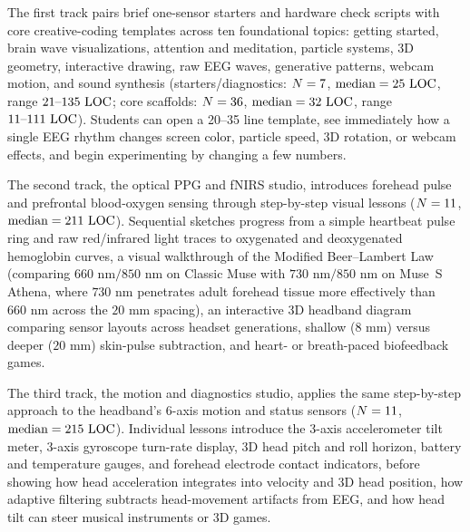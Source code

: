 \documentclass[11pt]{article}
\begin{document}
The first track pairs brief one-sensor starters and hardware check scripts with core creative-coding templates across ten foundational topics: getting started, brain wave visualizations, attention and meditation, particle systems, 3D geometry, interactive drawing, raw EEG waves, generative patterns, webcam motion, and sound synthesis (starters/diagnostics: $N = 7$, $\text{median} = 25\text{ LOC}$, range $21\text{--}135\text{ LOC}$; core scaffolds: $N = 36$, $\text{median} = 32\text{ LOC}$, range $11\text{--}111\text{ LOC}$). Students can open a 20--35 line template, see immediately how a single EEG rhythm changes screen color, particle speed, 3D rotation, or webcam effects, and begin experimenting by changing a few numbers.

The second track, the optical PPG and fNIRS studio, introduces forehead pulse and prefrontal blood-oxygen sensing through step-by-step visual lessons \citep{wyser2020short,russo2025fnirs} ($N = 11$, $\text{median} = 211\text{ LOC}$). Sequential sketches progress from a simple heartbeat pulse ring and raw red/infrared light traces to oxygenated and deoxygenated hemoglobin curves, a visual walkthrough of the Modified Beer--Lambert Law (comparing $660\text{ nm}/850\text{ nm}$ on Classic Muse with $730\text{ nm}/850\text{ nm}$ on Muse~S Athena, where $730\text{ nm}$ penetrates adult forehead tissue more effectively than $660\text{ nm}$ across the $20\text{ mm}$ spacing), an interactive 3D headband diagram comparing sensor layouts across headset generations, shallow ($8\text{ mm}$) versus deeper ($20\text{ mm}$) skin-pulse subtraction, and heart- or breath-paced biofeedback games.

The third track, the motion and diagnostics studio, applies the same step-by-step approach to the headband's 6-axis motion and status sensors \citep{rosanne2021adaptive,klug2022bemobil} ($N = 11$, $\text{median} = 215\text{ LOC}$). Individual lessons introduce the 3-axis accelerometer tilt meter, 3-axis gyroscope turn-rate display, 3D head pitch and roll horizon, battery and temperature gauges, and forehead electrode contact indicators, before showing how head acceleration integrates into velocity and 3D head position, how adaptive filtering subtracts head-movement artifacts from EEG, and how head tilt can steer musical instruments or 3D games.
\end{document}

